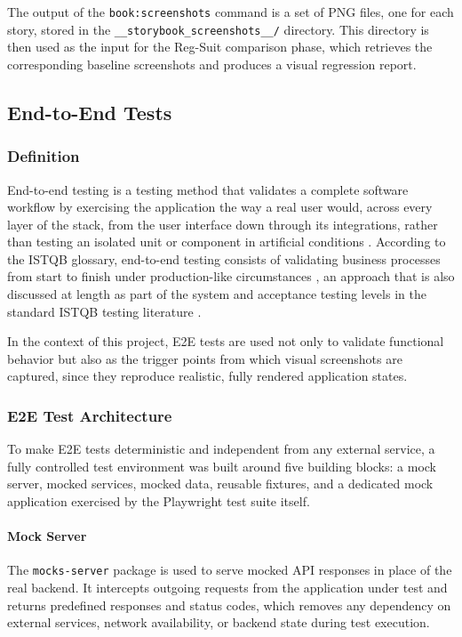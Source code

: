 The output of the \texttt{book:screenshots} command is a set of PNG files, one for each story, stored in the \texttt{\_\_storybook\_screenshots\_\_/} directory. This directory is then used as the input for the Reg-Suit comparison phase, which retrieves the corresponding baseline screenshots and produces a visual regression report.

\subsection{End-to-End Tests}

\subsubsection{Definition}

End-to-end testing is a testing method that validates a complete software workflow by exercising the application the way a real user would, across every layer of the stack, from the user interface down through its integrations, rather than testing an isolated unit or component in artificial conditions \cite{istqb_e2e}. According to the \ac{ISTQB} glossary, end-to-end testing consists of validating business processes from start to finish under production-like circumstances \cite{istqb_e2e}, an approach that is also discussed at length as part of the system and acceptance testing levels in the standard \ac{ISTQB} testing literature \cite{black_foundations}.


In the context of this project, \ac{E2E} tests are used not only to validate functional behavior but also as the trigger points from which visual screenshots are captured, since they reproduce realistic, fully rendered application states.

\subsubsection{E2E Test Architecture}
 
To make \ac{E2E} tests deterministic and independent from any external service, a fully controlled test environment was built around five building blocks: a mock server, mocked services, mocked data, reusable fixtures, and a dedicated mock application exercised by the Playwright test suite itself.
 
\paragraph{Mock Server} The \texttt{mocks-server} package is used to serve mocked \ac{API} responses in place of the real backend. It intercepts outgoing requests from the application under test and returns predefined responses and status codes, which removes any dependency on external services, network availability, or backend state during test execution.
 
